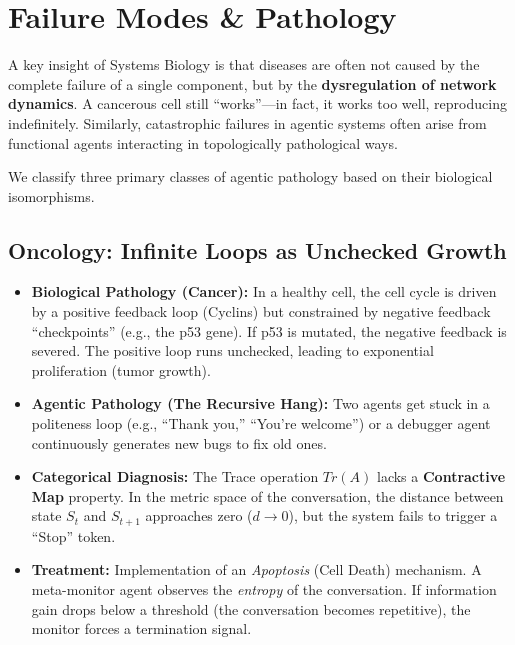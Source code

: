 \documentclass[11pt, a4paper]{article}
\begin{document}
\section{Failure Modes \& Pathology}

A key insight of Systems Biology is that diseases are often not caused by the complete failure of a single component, but by the \textbf{dysregulation of network dynamics}. A cancerous cell still ``works''---in fact, it works too well, reproducing indefinitely. Similarly, catastrophic failures in agentic systems often arise from functional agents interacting in topologically pathological ways.

We classify three primary classes of agentic pathology based on their biological isomorphisms.

\subsection{Oncology: Infinite Loops as Unchecked Growth}
\begin{itemize}
    \item \textbf{Biological Pathology (Cancer):} In a healthy cell, the cell cycle is driven by a positive feedback loop (Cyclins) but constrained by negative feedback ``checkpoints'' (e.g., the p53 gene). If p53 is mutated, the negative feedback is severed. The positive loop runs unchecked, leading to exponential proliferation (tumor growth).
    \item \textbf{Agentic Pathology (The Recursive Hang):} Two agents get stuck in a politeness loop (e.g., ``Thank you,'' ``You're welcome'') or a debugger agent continuously generates new bugs to fix old ones.
    \item \textbf{Categorical Diagnosis:} The Trace operation $Tr(A)$ lacks a \textbf{Contractive Map} property. In the metric space of the conversation, the distance between state $S_t$ and $S_{t+1}$ approaches zero ($d \to 0$), but the system fails to trigger a ``Stop'' token.
    \item \textbf{Treatment:} Implementation of an \textit{Apoptosis} (Cell Death) mechanism. A meta-monitor agent observes the \textit{entropy} of the conversation. If information gain drops below a threshold (the conversation becomes repetitive), the monitor forces a termination signal.
\end{itemize}
\end{document}
